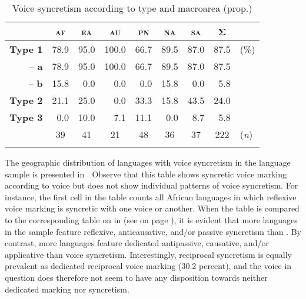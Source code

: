 \begin{table}
	\setlength{\tabcolsep}{3pt}
	\begin{tabularx}{0.64\textwidth}{lrrrrrrrl}
		\lsptoprule
		& \multicolumn{1}{c}{\textbf{\textsc{af}}} & \multicolumn{1}{c}{\textbf{\textsc{ea}}} & \multicolumn{1}{c}{\textbf{\textsc{au}}} & \multicolumn{1}{c}{\textbf{\textsc{pn}}} & \multicolumn{1}{c}{\textbf{\textsc{na}}} & \multicolumn{1}{c}{\textbf{\textsc{sa}}} & \multicolumn{1}{c}{\textbf{Σ}} & \\
		\midrule
		\textbf{Type 1} & 78.9 & 95.0 & 100.0 & 66.7 & 89.5 & 87.0 & 87.5 & (\%) \\
		\multicolumn{1}{r}{-- \textbf{a}} & 78.9 & 95.0 & 100.0 & 66.7 & 89.5 & 87.0 & 87.5 & \\
		\multicolumn{1}{r}{-- \textbf{b}} & 15.8 & 0.0 & 0.0 & 0.0 & 15.8 & 0.0 & 5.8 & \\
		\textbf{Type 2} & 21.1 & 25.0 & 0.0 & 33.3 & 15.8 & 43.5 & 24.0 & \\
		\textbf{Type 3} & 0.0 & 10.0 & 7.1 & 11.1 & 0.0 & 8.7 & 5.8 & \\
		\midrule
		& \multicolumn{1}{c}{39} & \multicolumn{1}{c}{41} & \multicolumn{1}{c}{21} & \multicolumn{1}{c}{48} & \multicolumn{1}{c}{36} & \multicolumn{1}{c}{37} & \multicolumn{1}{c}{222} & (\textit{n}) \\
		\lspbottomrule
	\end{tabularx}
	\caption{Voice syncretism according to type and macroarea (prop.)}
	\label{tab:ch6:voice-syncretism-type-2}
\end{table} 

The geographic distribution of languages with voice syncretism in the language sample is presented in . Observe that this table shows syncretic voice marking according to voice but does not show individual patterns of voice syncretism. For instance, the first cell in the table counts all African languages in which reflexive voice marking is syncretic with one voice or another. When the table is compared to the corresponding table on  in  (see  on page \pageref{tab:ch6:voice-dedicated-1}), it is evident that more languages in the sample feature reflexive, anticausative, and/or passive syncretism than . By contrast, more languages feature dedicated antipassive, causative, and/or applicative  than voice syncretism. Interestingly, reciprocal syncretism is equally prevalent as dedicated reciprocal voice marking (30.2 percent), and the voice in question does therefore not seem to have any disposition towards neither dedicated marking nor syncretism.

